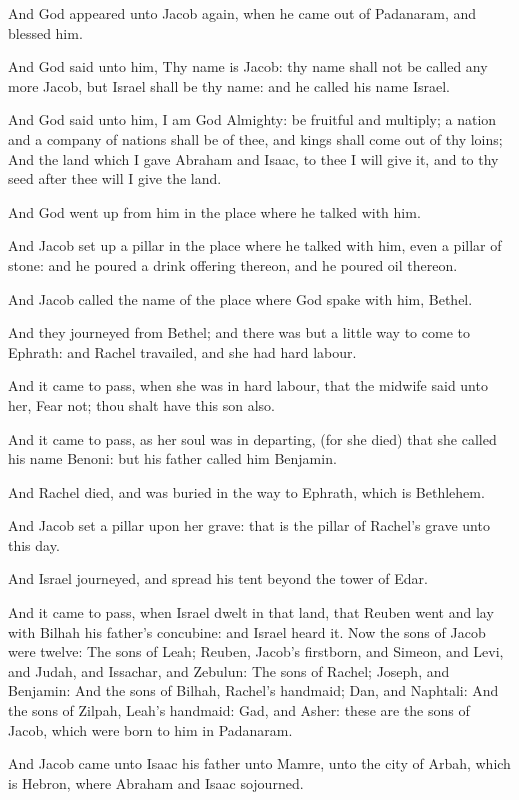 \verse And God appeared unto Jacob again, when he came out of Padanaram,
and blessed him.

\verse And God said unto him, Thy name is Jacob: thy name shall not be
called any more Jacob, but Israel shall be thy name: and he called his
name Israel.

\verse And God said unto him, I am God Almighty: be fruitful and
multiply; a nation and a company of nations shall be of thee, and
kings shall come out of thy loins; \verse And the land which I gave
Abraham and Isaac, to thee I will give it, and to thy seed after thee
will I give the land.

\verse And God went up from him in the place where he talked with him.

\verse And Jacob set up a pillar in the place where he talked with him,
even a pillar of stone: and he poured a drink offering thereon, and he
poured oil thereon.

\verse And Jacob called the name of the place where God spake with him,
Bethel.

\verse And they journeyed from Bethel; and there was but a little way
to come to Ephrath: and Rachel travailed, and she had hard labour.

\verse And it came to pass, when she was in hard labour, that the
midwife said unto her, Fear not; thou shalt have this son also.

\verse And it came to pass, as her soul was in departing, (for she
died) that she called his name Benoni: but his father called him
Benjamin.

\verse And Rachel died, and was buried in the way to Ephrath, which is
Bethlehem.

\verse And Jacob set a pillar upon her grave: that is the pillar of
Rachel's grave unto this day.

\verse And Israel journeyed, and spread his tent beyond the tower of
Edar.

\verse And it came to pass, when Israel dwelt in that land, that Reuben
went and lay with Bilhah his father's concubine: and Israel heard it.
Now the sons of Jacob were twelve: \verse The sons of Leah; Reuben,
Jacob's firstborn, and Simeon, and Levi, and Judah, and Issachar, and
Zebulun: \verse The sons of Rachel; Joseph, and Benjamin: \verse And the
sons of Bilhah, Rachel's handmaid; Dan, and Naphtali: \verse And the
sons of Zilpah, Leah's handmaid: Gad, and Asher: these are the sons of
Jacob, which were born to him in Padanaram.

\verse And Jacob came unto Isaac his father unto Mamre, unto the city
of Arbah, which is Hebron, where Abraham and Isaac sojourned.

